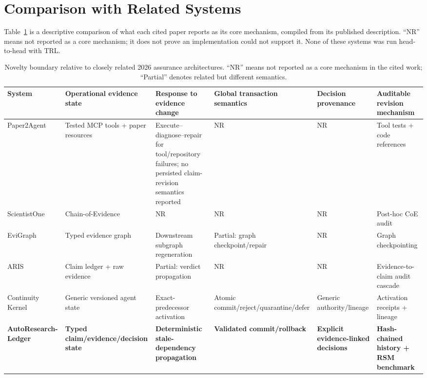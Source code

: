 \documentclass[journal]{IEEEtran}
\begin{document}
\section{Comparison with Related Systems}
Table~\ref{tab:novelty_boundary} is a descriptive comparison of what each cited paper reports as its core mechanism, compiled from its published description. ``NR'' means not reported as a core mechanism; it does not prove an implementation could not support it. None of these systems was run head-to-head with TRL.

\begin{table}[!t]
\centering
\caption{Novelty boundary relative to closely related 2026 assurance architectures. ``NR'' means not reported as a core mechanism in the cited work; ``Partial'' denotes related but different semantics.}
\label{tab:novelty_boundary}
\scriptsize
\begin{tabularx}{\textwidth}{l>{\raggedright\arraybackslash}X>{\raggedright\arraybackslash}X>{\raggedright\arraybackslash}X>{\raggedright\arraybackslash}X>{\raggedright\arraybackslash}X}
\toprule
System & Operational evidence state & Response to evidence change & Global transaction semantics & Decision provenance & Auditable revision mechanism \\
\midrule
Paper2Agent \cite{miao2026paper2agent} & Tested MCP tools + paper resources & Execute--diagnose--repair for tool/repository failures; no persisted claim-revision semantics reported & NR & NR & Tool tests + code references \\
ScientistOne \cite{meng2026scientistone} & Chain-of-Evidence & NR & NR & NR & Post-hoc CoE audit \\
EviGraph \cite{ren2026evigraph} & Typed evidence graph & Downstream subgraph regeneration & Partial: graph checkpoint/repair & NR & Graph checkpointing \\
ARIS \cite{yang2026aris} & Claim ledger + raw evidence & Partial: verdict propagation & NR & NR & Evidence-to-claim audit cascade \\
Continuity Kernel \cite{he2026continuity} & Generic versioned agent state & Exact-predecessor activation & Atomic commit/reject/quarantine/defer & Generic authority/lineage & Activation receipts + lineage \\
\textbf{AutoResearch-Ledger} & \textbf{Typed claim/evidence/decision state} & \textbf{Deterministic stale-dependency propagation} & \textbf{Validated commit/rollback} & \textbf{Explicit evidence-linked decisions} & \textbf{Hash-chained history + RSM benchmark} \\
\bottomrule
\end{tabularx}
\end{table}
\end{document}
